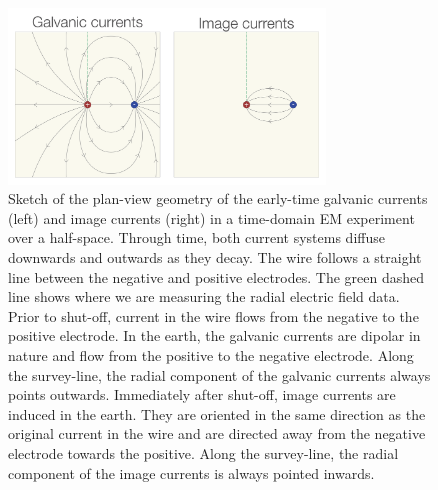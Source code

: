 \begin{figure}
    \begin{center}
    \includegraphics[width=0.75\textwidth]{figures/em_casing/current-systems-sketch.png}
    \end{center}
\caption{
    Sketch of the plan-view geometry of the early-time galvanic currents (left) and image currents (right) in a time-domain EM experiment over a half-space.
    Through time, both current systems diffuse downwards and outwards as they decay.
    The wire follows a straight line between the negative and positive electrodes. The green dashed line shows where we are measuring the
    radial electric field data. Prior to shut-off, current in the wire flows from
    the negative to the positive electrode. In the earth, the galvanic currents are dipolar in nature and flow
    from the positive to the negative electrode. Along the survey-line, the radial component of the galvanic currents always points outwards.
    Immediately after shut-off, image currents are induced in the earth. They are oriented in the same direction as the original current in the wire
    and are directed away from the negative electrode towards the positive. Along the survey-line, the radial component of the image currents is always pointed inwards.
}
\label{fig:current-systems-sketch}
\end{figure}




